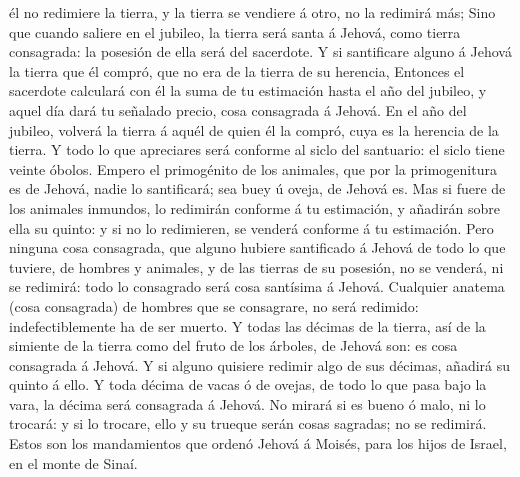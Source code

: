 él no redimiere la tierra, y la tierra se vendiere á otro, no la
redimirá más;  Sino que cuando saliere en el jubileo, la
tierra será santa á Jehová, como tierra consagrada: la posesión de ella
será del sacerdote.  Y si santificare alguno á Jehová la
tierra que él compró, que no era de la tierra de su herencia,
 Entonces el sacerdote calculará con él la suma de tu
estimación hasta el año del jubileo, y aquel día dará tu señalado
precio, cosa consagrada á Jehová.  En el año del jubileo,
volverá la tierra á aquél de quien él la compró, cuya es la herencia de
la tierra.  Y todo lo que apreciares será conforme al
siclo del santuario: el siclo tiene veinte óbolos. 
Empero el primogénito de los animales, que por la primogenitura es de
Jehová, nadie lo santificará; sea buey ú oveja, de Jehová es.
 Mas si fuere de los animales inmundos, lo redimirán
conforme á tu estimación, y añadirán sobre ella su quinto: y si no lo
redimieren, se venderá conforme á tu estimación.  Pero
ninguna cosa consagrada, que alguno hubiere santificado á Jehová de todo
lo que tuviere, de hombres y animales, y de las tierras de su posesión,
no se venderá, ni se redimirá: todo lo consagrado será cosa santísima á
Jehová.  Cualquier anatema (cosa consagrada) de hombres
que se consagrare, no será redimido: indefectiblemente ha de ser muerto.
 Y todas las décimas de la tierra, así de la simiente de
la tierra como del fruto de los árboles, de Jehová son: es cosa
consagrada á Jehová.  Y si alguno quisiere redimir algo
de sus décimas, añadirá su quinto á ello.  Y toda décima
de vacas ó de ovejas, de todo lo que pasa bajo la vara, la décima será
consagrada á Jehová.  No mirará si es bueno ó malo, ni lo
trocará: y si lo trocare, ello y su trueque serán cosas sagradas; no se
redimirá.  Estos son los mandamientos que ordenó Jehová á
Moisés, para los hijos de Israel, en el monte de Sinaí.
